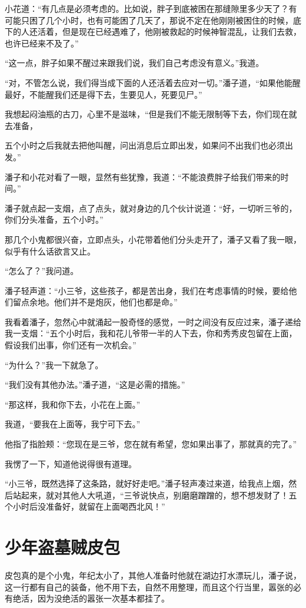 小花道：“有几点是必须考虑的。比如说，胖子到底被困在那缝隙里多少天了？有可能只困了几个小时，也有可能困了几天了，那说不定在他刚刚被困住的时候，底下的人还活着，但是现在已经遇难了，他刚被救起的时候神智混乱，让我们去救，也许已经来不及了。”

“这一点，胖子如果不醒过来跟我们说，我们自己考虑没有意义。”我道。

“对，不管怎么说，我们得当成下面的人还活着去应对一切。”潘子道，“如果他能醒最好，不能醒我们还是得下去，生要见人，死要见尸。”

我想起闷油瓶的古刀，心里不是滋味，“但是我们不能无限制等下去，你们现在就去准备，

五个小时之后我就去把他叫醒，问出消息后立即出发，如果问不出我们也必须出发。”

潘子和小花对看了一眼，显然有些犹豫，我道：“不能浪费胖子给我们带来的时间。”

潘子就点起一支烟，点了点头，就对身边的几个伙计说道：“好，一切听三爷的，你们分头准备，五个小时。”

那几个小鬼都很兴奋，立即点头，小花带着他们分头走开了，潘子又看了我一眼，似乎有什么话欲言又止。

“怎么了？”我问道。

潘子轻声道：“小三爷，这些孩子，都是苦出身，我们在考虑事情的时候，要给他们留点余地。他们并不是炮灰，他们也都是命。”

我看着潘子，忽然心中就涌起一股奇怪的感觉，一时之间没有反应过来，潘子递给我一支烟：“五个小时后，我和花儿爷带一半的人下去，你和秀秀皮包留在上面，假设我们出事，你们还有一次机会。”

“为什么？”我一下就急了。

“我们没有其他办法。”潘子道，“这是必需的措施。”

“那这样，我和你下去，小花在上面。”

我道，“要我在上面等，我宁可下去。”

他指了指脸颊：“您现在是三爷，您在就有希望，您如果出事了，那就真的完了。”

我愣了一下，知道他说得很有道理。

“小三爷，既然选择了这条路，就好好走吧。”潘子轻声凑过来道，给我点上烟，然后站起来，就对其他人大吼道，“三爷说快点，别磨磨蹭蹭的，想不想发财了！五个小时后没准备好，就留在上面喝西北风！”

\chapter{少年盗墓贼皮包}

皮包真的是个小鬼，年纪太小了，其他人准备时他就在湖边打水漂玩儿，潘子说，这一行都有自己的装备，他不用下去，自然不用整理，而且这个行当里，嚣张的必有绝活，因为没绝活的嚣张一次基本都挂了。

